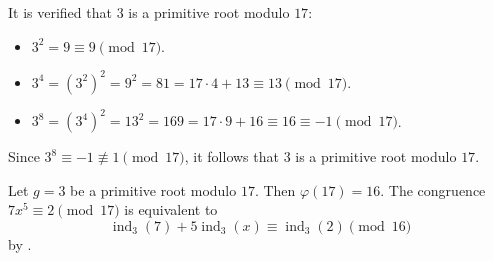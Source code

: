 \begin{enumerate}
\begin{enumerate}
\begin{subanswer}
      It is verified that $3$ is a primitive root modulo $17$:
      \begin{itemize}
        \item $3^2 = 9 \equiv 9 \pmod{17}$.
        \item $3^4 = (3^2)^2 = 9^2 = 81 = 17 \cdot 4 + 13 \equiv 13 \pmod{17}$.
        \item $3^8 = (3^4)^2 = 13^2 = 169 = 17 \cdot 9 + 16 \equiv 16 \equiv -1 \pmod{17}$.
      \end{itemize}
      Since $3^8 \equiv -1 \not\equiv 1 \pmod{17}$, it follows that $3$ is a primitive root modulo $17$.
      
      Let $g = 3$ be a primitive root modulo $17$. Then $\varphi(17) = 16$.
      The congruence $7x^5 \equiv 2 \pmod{17}$ is equivalent to
      \[
      \operatorname{ind}_3(7) + 5\operatorname{ind}_3(x) \equiv \operatorname{ind}_3(2) \pmod{16}
      \]
      by .
      

\end{subanswer}
\end{enumerate}
\end{enumerate}
